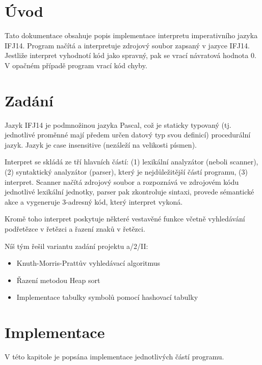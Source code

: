 \documentclass[12pt,a4paper,titlepage,final]{report}
\begin{document}
\pagestyle{plain}
\setcounter{page}{1}
{\hypersetup{linkcolor=black}
\tableofcontents
}

\newpage
\pagestyle{plain}
\setcounter{page}{1}


\chapter{Úvod} \label{uvod}
Tato dokumentace obsahuje popis implementace interpretu imperativního jazyka IFJ14. Program načítá a interpretuje zdrojový soubor zapsaný v jazyce IFJ14. Jestliže interpret vyhodnotí kód jako spravný, pak se vrací návratová hodnota 0. V opačném případě program vrací kód chyby.

\chapter{Zadání} \label{zadani}
Jazyk IFJ14 je podmnožinou jazyka Pascal, což je staticky typovaný (tj. jednotlivé proměnné mají předem určen datový typ svou definicí) procedurální jazyk. Jazyk je case insensitive (nezáleží na velikosti písmen).

Interpret se skládá ze tří hlavních částí: (1) lexikální analyzátor (neboli scanner), (2) syntaktický analyzátor (parser), který je nejdůležitější částí programu, (3) interpret. Scanner načítá zdrojový soubor a rozpoznává ve zdrojovém kódu jednotlivé lexikální jednotky, parser pak zkontroluje sintaxi, provede sémantické akce a vygeneruje 3-adresný kód, který interpret vykoná.

Kromě toho interpret poskytuje některé vestavěné funkce včetně vyhledávání podřetězce v řetězci a řazení znaků v řetězci.

Níš tým řešil variantu zadání projektu a/2/II:
\begin{itemize}
\item Knuth-Morris-Prattův vyhledávací algoritmus
\item Řazení metodou Heap sort
\item Implementace tabulky symbolů pomocí hashovací tabulky
\end{itemize}

\chapter{Implementace} \label{implementace}
V této kapitole je popsána implementace jednotlivých částí programu.
\end{document}
